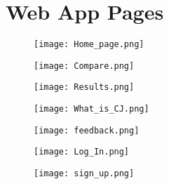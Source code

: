 \chapter{Web App Pages}
\label{app:web_designs}

\begin{figure}[h]
	\centering
	\texttt{[image: Home\_page.png]}
	\caption{}
	
		
	\end{figure} 
\begin{figure}[h]
	\centering
	\texttt{[image: Compare.png]}
	\caption{}
	
		
	\end{figure} 

\begin{figure}[h]
	\centering
	\texttt{[image: Results.png]}
	\caption{}
	
		
	\end{figure} 

\begin{figure}[h]
	\centering
	\texttt{[image: What\_is\_CJ.png]}
	\caption{}

		
	\end{figure} 
\begin{figure}[h]
	\centering
	\texttt{[image: feedback.png]}
	\caption{}
		
	\end{figure} 

\begin{figure}[h]
	\centering
	\texttt{[image: Log\_In.png]}
	\caption{}
	
\end{figure} 


\begin{figure}[h]
	\centering
	\texttt{[image: sign\_up.png]}
	\caption{}
	
\end{figure} 



